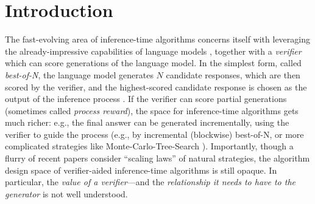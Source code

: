 \section{Introduction}
\label{sec:intro}

The fast-evolving area of inference-time algorithms concerns itself with leveraging the already-impressive capabilities of language models \citep{raffel2020exploring, brown2020language, touvron2023llama}, %
together with a \emph{verifier} which can score generations of the language model. In the simplest form, called \emph{best-of-N}, the language model generates $N$ candidate responses,
which are then scored by the verifier,
and the highest-scored candidate response is chosen as the output of the inference process
\citep{cobbe2021verifiers, nakano2022webgpt}. If the verifier can score partial generations (sometimes called \emph{process reward}), the space for inference-time algorithms gets much richer: e.g., the final answer can be generated incrementally, using the verifier to guide the process (e.g., by incremental (blockwise) best-of-N, or more complicated strategies like Monte-Carlo-Tree-Search \citep{Browne2012ASO, hao2023reasoning}). Importantly, though a flurry of recent papers consider ``scaling laws'' of natural strategies, the algorithm design space of verifier-aided inference-time algorithms is still opaque.  In particular, the \emph{value of a verifier}---and the \emph{relationship it needs to have to the generator} is not well understood.     

